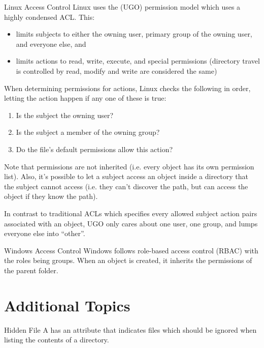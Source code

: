 \documentclass[code]{amznotes}
\begin{document}
\begin{exbox}{Linux Access Control}{}
    Linux uses the  (UGO) permission model which uses a highly condensed ACL. This:
    \begin{itemize}[noitemsep]
        \item limits subjects to either the owning user, primary group of the owning user, and everyone else, and
        \item limits actions to read, write, execute, and special permissions (directory travel is controlled by read, modify and write are considered the same)
    \end{itemize}
    When determining permissions for actions, Linux checks the following in order, letting the action happen if any one of these is true:
    \begin{enumerate}[noitemsep]
        \item Is the subject the owning user?
        \item Is the subject a member of the owning group?
        \item Do the file's default permissions allow this action?
    \end{enumerate}
    Note that permissions are not inherited (i.e. every object has its own permission list). Also, it's possible to let a subject access an object inside a directory that the subject cannot access (i.e. they can't discover the path, but can access the object if they know the path).

    In contrast to traditional ACLs which specifies every allowed subject action pairs associated with an object, UGO only cares about one user, one group, and lumps everyone else into ``other''.
\end{exbox}

\begin{exbox}{Windows Access Control}{}
    Windows follows role-based access control (RBAC) with the roles being groups. When an object is created, it inherits the permissions of the parent folder.
\end{exbox}

\section{Additional Topics}

\begin{dfnbox}{Hidden File}{}
    A  has an attribute that indicates files which should be ignored when listing the contents of a directory.
\end{dfnbox}
\end{document}
